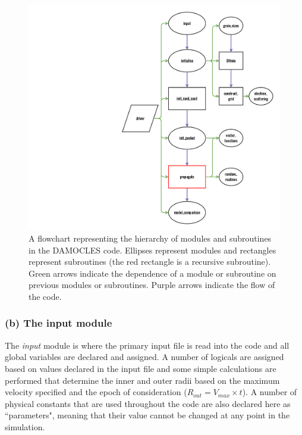         \begin{figure}
        \centering
        \includegraphics[scale=0.18, trim=430mm 20mm 30mm 25mm]{chapters/chapter2/code_modules_flowchart.png}
        \caption{A flowchart representing the hierarchy of modules and subroutines in the DAMOCLES code.  Ellipses represent modules and rectangles represent subroutines (the red rectangle is a recursive subroutine).  Green arrows indicate the dependence of a module or subroutine on previous modules or subroutines.  Purple arrows indicate the flow of the code.}
        \label{fig:flowchart_mods}
        \end{figure}

        
        \subsubsection{(b) The input module}
        The \textit{input} module is where the primary input file is read into the code and all global variables are declared and assigned.  A number of logicals are assigned based on values declared in the input file and some simple calculations are performed that determine the inner and outer radii based on the maximum velocity specified and the epoch of consideration ($R_{out} = V_{max} \times t$).  A number of physical constants that are used throughout the code are also declared here as ``parameters", meaning that their value cannot be changed at any point in the simulation.
        
